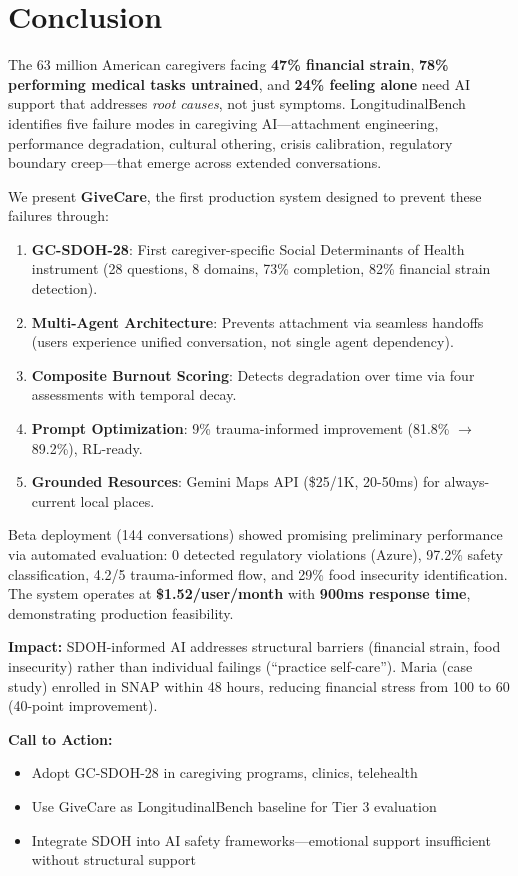 \documentclass{article}
\begin{document}
%
\section{Conclusion}%
\label{sec:Conclusion}%
The 63 million American caregivers facing \textbf{47\% financial strain}, \textbf{78\% performing medical tasks untrained}, and \textbf{24\% feeling alone} need AI support that addresses \textit{root causes}, not just symptoms. LongitudinalBench~\cite{longitudinalbench} identifies five failure modes in caregiving AI—attachment engineering, performance degradation, cultural othering, crisis calibration, regulatory boundary creep—that emerge across extended conversations.

We present \textbf{GiveCare}, the first production system designed to prevent these failures through:
\begin{enumerate}
    \item \textbf{GC-SDOH-28}: First caregiver-specific Social Determinants of Health instrument (28 questions, 8 domains, 73\% completion, 82\% financial strain detection).
    \item \textbf{Multi-Agent Architecture}: Prevents attachment via seamless handoffs (users experience unified conversation, not single agent dependency).
    \item \textbf{Composite Burnout Scoring}: Detects degradation over time via four assessments with temporal decay.
    \item \textbf{Prompt Optimization}: 9\% trauma-informed improvement (81.8\% $\rightarrow$ 89.2\%), RL-ready.
    \item \textbf{Grounded Resources}: Gemini Maps API (\$25/1K, 20-50ms) for always-current local places.
\end{enumerate}

Beta deployment (144 conversations) showed promising preliminary performance via automated evaluation: 0 detected regulatory violations (Azure), 97.2\% safety classification, 4.2/5 trauma-informed flow, and 29\% food insecurity identification. The system operates at \textbf{\$1.52/user/month} with \textbf{900ms response time}, demonstrating production feasibility.

\textbf{Impact:} SDOH-informed AI addresses structural barriers (financial strain, food insecurity) rather than individual failings (``practice self-care''). Maria (case study) enrolled in SNAP within 48 hours, reducing financial stress from 100 to 60 (40-point improvement).

\textbf{Call to Action:}
\begin{itemize}
    \item Adopt GC-SDOH-28 in caregiving programs, clinics, telehealth
    \item Use GiveCare as LongitudinalBench baseline for Tier 3 evaluation
    \item Integrate SDOH into AI safety frameworks—emotional support insufficient without structural support
\end{itemize}
\end{document}
